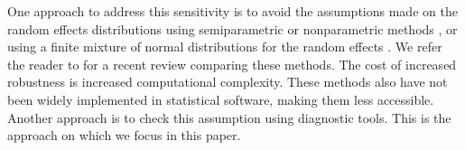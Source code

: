 \documentclass[12pt]{article} %
\newcommand{\hh}[1]{{\color{orange} #1}}
\begin{document}
One approach to address this sensitivity is to avoid the assumptions made on the random effects distributions using semiparametric or nonparametric methods \citep{Shen:1999gd, Zhang:2001wo, Ghidey:2004id}, or using a finite mixture of normal distributions for the random effects \citep{Verbeke:1996va}. We refer the reader to \cite{Ghidey:2010de} for a recent review comparing these methods. The cost of increased robustness is increased computational complexity. These methods also have not been widely implemented in statistical software, making them less accessible. Another approach is to check this assumption using diagnostic tools. This is the approach on which we focus in this paper.

\end{document}
